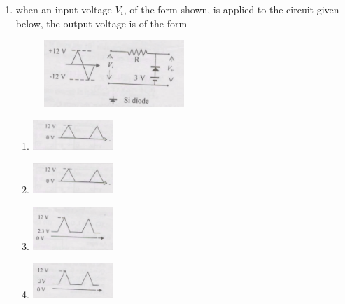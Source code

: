 \documentclass[journal,13pt,onecolumn]{IEEEtran}
\begin{document}
\begin{enumerate}[itemsep = 1em]
\begin{multicols}{4}
\begin{enumerate}
    \item 42
    \item 48
    \item 56
    \item 70
\end{enumerate} 
\end{multicols}

\item when an input voltage $V_i$, of the form shown, is applied to the circuit given below, the output voltage is of the form

\hfill{}

\begin{figure}[ht!]
    \centering
    \includegraphics[width=0.5\textwidth]{fig11.jpeg}
    \caption{}
    \label{fig:fig11.jpeg}
\end{figure}
\begin{multicols}{2}
\begin{enumerate}
    \item \includegraphics[width=0.25\textwidth]{fig12.jpeg} \hfill
    \item \includegraphics[width=0.25\textwidth]{fig13.jpeg} \hfill
    \item \includegraphics[width=0.25\textwidth]{fig14.jpeg} \hfill
    \item \includegraphics[width=0.25\textwidth]{fig15.jpeg} \hfill
\end{enumerate}
\end{multicols}




\end{enumerate}
\end{document}
